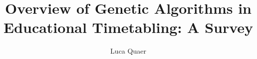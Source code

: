 \documentclass[sigconf]{acmart}
\begin{document}
\title{Overview of Genetic Algorithms in Educational Timetabling: A Survey}

\author{Luca Quaer}






\end{document}

